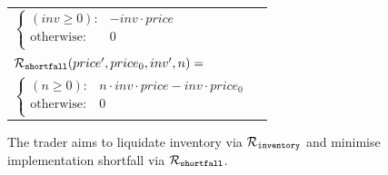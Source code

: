 \begin{itemize}
{\begin{tabular}{ll}
                \qquad $ \begin{cases}
                (inv \geq 0) : & -inv \cdot price \\
                \text{otherwise} : & 0 \\
                \end{cases} $ & $ $ \\           
            $ \mathcal{R}_{\mathtt{shortfall}}(price', price_0, inv', n) = $ &  $ $ \\
                \qquad $ \begin{cases}
                (n \geq 0) : & n \cdot inv \cdot price - inv \cdot price_0 \\
                \text{otherwise} : & 0 \\
                \end{cases} $ & $ $ \\           
        \end{tabular}
    }    
\end{itemize}

The trader aims to liquidate inventory via {\footnotesize $ \mathcal{R}_{\mathtt{inventory}} $} and minimise implementation shortfall via {\footnotesize $ \mathcal{R}_{\mathtt{shortfall}} $}.

